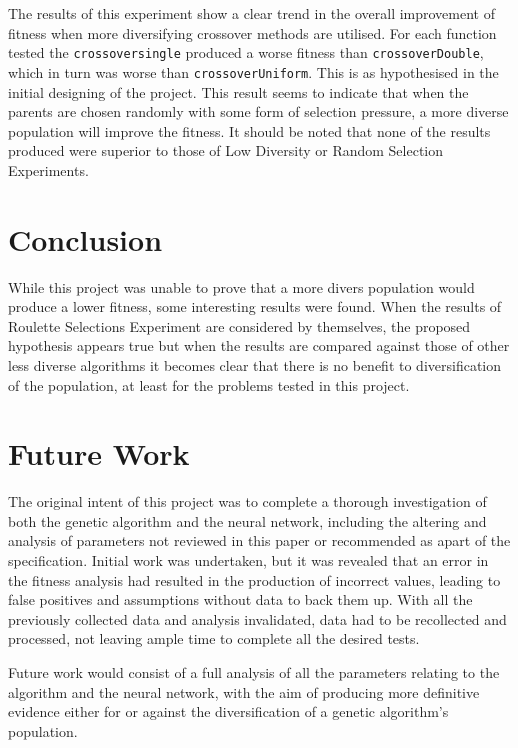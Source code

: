 			The results of this experiment show a clear trend  in the overall improvement of fitness when more diversifying crossover methods are utilised. For each function tested the \texttt{crossoversingle} produced a worse fitness than \texttt{crossoverDouble}, which in turn was worse than \texttt{crossoverUniform}. This is as hypothesised in the initial designing of the project. This result seems to indicate that when the parents are chosen randomly with some form of selection pressure, a more diverse population will improve the fitness. It should be noted  that none of the results produced were superior to those of Low Diversity or Random Selection Experiments. 
			
\section{Conclusion}
	While this project was unable to prove that a more divers population would produce a lower fitness, some interesting results were found. When the results of Roulette Selections Experiment are considered by themselves, the proposed hypothesis appears true but when the results are compared against  those of other less diverse algorithms it becomes clear that there is no benefit to diversification of the population, at least for the problems tested in this project. 

\section{Future Work}
	The original intent of this project was to complete a thorough investigation of both the genetic algorithm and the neural network, including the altering and analysis of parameters not reviewed in this paper or recommended as apart of the specification. Initial work was undertaken, but it was revealed that an error in the fitness analysis had resulted in the production of incorrect values, leading to false positives and assumptions without data to back them up. With all the previously collected data and analysis invalidated, data  had to be recollected and processed, not leaving ample time to complete all the desired tests.
	
	Future work would consist of a full analysis of all the parameters relating to the algorithm and the neural network, with the aim of producing more definitive evidence either for or against the diversification of a genetic algorithm's population.